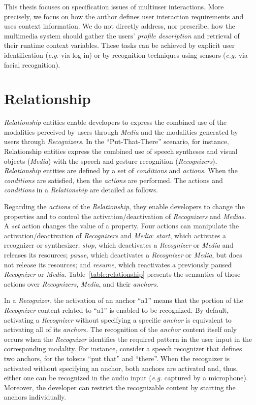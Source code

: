\documentclass[
  doutorado,
  american
]{ThesisPUC}
\newcommand{\tab}[1]{Table~\ref{#1}}
\begin{document}
This thesis focuses on specification issues of multiuser interactions. More
precisely, we focus on how the author defines user interaction requirements and
uses context information. We do not directly address, nor prescribe, how the
multimedia system should gather the users’ \textit{profile description} and
retrieval of their runtime context variables. These tasks can be achieved by
explicit user identification (\textit{e.g.} via log in) or by recognition techniques using
sensors (\textit{e.g.} via facial recognition).

\section{Relationship}
\label{sec:approuach:relationship}

\textit{Relationship} entities enable developers to express the combined use of
the modalities perceived by users through \textit{Media} and the modalities
generated by users through \textit{Recognizers}. In the “Put-That-There”
scenario, for instance, Relationship entities express the combined use of speech
syntheses and visual objects (\textit{Media}) with the speech and gesture
recognition (\textit{Recognizers}). 
\textit{Relationship} entities are defined by a set of \textit{conditions} and 
\textit{actions}. When the 
\textit{conditions} are satisfied, then the \textit{actions} are performed. The
actions and 
\textit{conditions} in a \textit{Relationship} are detailed as follows. 

Regarding the \textit{actions} of the \textit{Relationship}, they enable
developers to change the properties and to control the activation/deactivation
of \textit{Recognizers} and \textit{Medias}. A \textit{set} action changes the
value of a property. Four actions can manipulate the activation/deactivation of
\textit{Recognizers} and \textit{Media}: \textit{start}, which activates a
recognizer or synthesizer; \textit{stop}, which deactivates a
\textit{Recognizer} or \textit{Media} and releases its resources;
\textit{pause}, which deactivates a \textit{Recognizer} or \textit{Media}, but
does not release its resources; and \textit{resume}, which reactivates a
previously paused \textit{Recognizer} or \textit{Media}.
\tab{table:relationship} presents the semantics of those actions over
\textit{Recognizers}, \textit{Media}, and their \textit{anchors}.

In a \textit{Recognizer}, the activation of an anchor “a1” means that the
portion of the 
\textit{Recognizer} content related to “a1” is enabled to be recognized. By
default, activating a \textit{Recognizer} without specifying a specific
\textit{anchor} is equivalent to activating all of its \textit{anchor}s. The
recognition of the \textit{anchor} content itself only occurs when the
\textit{Recognizer} identifies the required pattern in the user input in the
corresponding modality. For instance, consider a speech recognizer that defines
two anchors, for the tokens “put that” and “there”. When the recognizer is
activated without specifying an anchor, both anchors are activated and, thus,
either one can be recognized in the audio input (\textit{e.g.} captured by a 
microphone).
Moreover, the developer can restrict the recognizable content by starting the
anchors individually.
\end{document}
